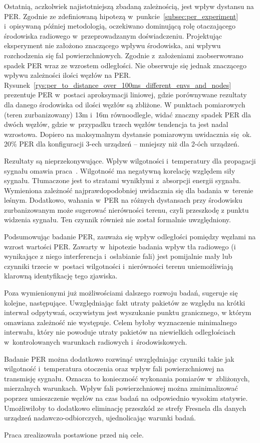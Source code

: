 Ostatnią, aczkolwiek najistotniejszą zbadaną zależnością, jest wpływ dystansu na \gls{PER}. Zgodnie ze zdefiniowaną
hipotezą w~punkcie~\ref{subsec:per_experiment} i~opisywaną później metodologią, oczekiwano dominującą rolę otaczającego
środowiska radiowego w~przeprowadzanym doświadczeniu. Projektując eksperyment nie założono znaczącego wpływu środowiska,
ani wpływu rozchodzenia się fal powierzchniowych. Zgodnie z~założeniami zaobserwowano spadek PER wraz ze wzrostem odległości.
Nie obserwuje się jednak znaczącego wpływu zależności ilości węzłów na PER.
Rysunek~\ref{rys:per_to_distance_over_100ms_different_envs_and_nodes} prezentuje PER w~postaci aproksymacji liniowej, gdzie porównywane
rezultaty dla danego środowiska od ilości węzłów są zbliżone. W punktach pomiarowych (teren zurbanizowany) 13m i~16m równoodlegle,
widać znaczny spadek PER dla dwóch węzłów, gdzie w~przypadku trzech węzłów tendencja ta jest nadal wzrostowa. Dopiero na maksymalnym
dystansie pomiarowym uwidacznia się ok. 20\% PER dla konfiguracji 3-ech urządzeń -- mniejszy niż dla 2-óch urządzeń.

Rezultaty są nieprzekonywujące. Wpływ wilgotności i~temperatury dla propagacji sygnału omawia praca~\cite{yi_lim_review_2020}.
Wilgotność ma negatywną korelację względem siły sygnału. Tłumaczone jest to stratami wynikłymi z~absorpcji energii sygnału. Wymieniona zależność
najprawdopodobniej uwidacznia się dla badania w~terenie leśnym. Dodatkowo, wahania w~PER na różnych dystansach przy środowisku zurbanizowanym
może sugerować nierówności terenu, czyli przeszkodę z punktu widzenia sygnału. Ten czynnik również nie został formalnie uwzględniony.

Podsumowując badanie PER, zauważa się wpływ odległości pomiędzy węzłami na wzrost wartości PER. 
Zawarty w~hipotezie badania wpływ tła radiowego (i wynikające z niego interferencja i~osłabianie fali) jest pomijalnie
mały lub czynniki trzecie w~postaci wilgotności i~nierówności terenu uniemożliwiają klarowną identyfikację tego zjawiska.

Poza wymienionymi już możliwościami dalszego rozwoju badań, sugeruje się kolejne, następujące. Uwzględniając fakt utraty pakietów
ze względu na krótki interwał odpytywań, oczywistym jest wyszukanie punktu granicznego, w którym omawiana zależność nie występuje.
Celem byłoby wyznaczenie minimalnego interwału, który nie powoduje utraty pakietów na niewielkich odległościach w~kontrolowanych
warunkach radiowych i~środowiskowych.

Badanie PER można dodatkowo rozwinąć uwzględniając czynniki takie jak wilgotność i~temperatura otoczenia oraz wpływ
fali powierzchniowej na transmisję sygnału. Oznacza to konieczność wykonania pomiarów w~zbliżonych, mierzalnych warunkach.
Wpływ fali powierzchniowej można zminimalizować poprzez umieszczenie węzłów na czas badań na odpowiednio wysokim statywie.
Umożliwiłoby to dodatkowo eliminację przeszkód ze strefy Fresnela dla danych urządzeń nadawczo-odbiorczych, ujednolicając
warunki badań.

Praca zrealizowała postawione przed nią cele.
